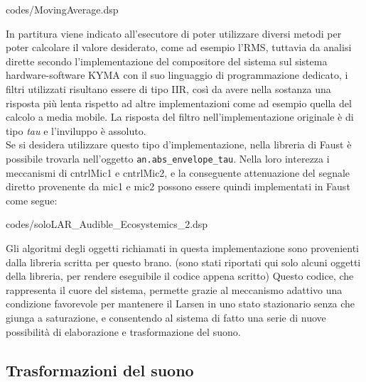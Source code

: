 \vspace{0.5cm} 

{codes/MovingAverage.dsp}

In partitura viene indicato all'esecutore di poter utilizzare diversi metodi 
per poter calcolare il valore desiderato, come ad esempio l'RMS, 
tuttavia da analisi dirette secondo l'implementazione del compositore del sistema sul 
sistema hardware-software KYMA con il suo linguaggio di programmazione dedicato, 
i filtri utilizzati risultano essere di tipo IIR,
così da avere nella sostanza una risposta più lenta rispetto ad altre implementazioni come ad esempio 
quella del calcolo a media mobile.  
La risposta del filtro nell'implementazione originale è di tipo \textit{tau} 
e l'inviluppo è assoluto. \\
Se si desidera utilizzare questo tipo d'implementazione, nella libreria di Faust 
è possibile trovarla nell'oggetto \verb|an.abs_envelope_tau|.
Nella loro interezza i meccanismi di cntrlMic1 e cntrlMic2, e la conseguente
attenuazione del segnale diretto provenente da mic1 e mic2 
possono essere quindi implementati in Faust come segue:

\vspace{0.5cm} 

{codes/soloLAR_Audible_Ecosystemics_2.dsp}

Gli algoritmi degli oggetti richiamati in questa implementazione sono 
provenienti dalla libreria scritta per questo brano.
(sono stati riportati qui solo alcuni oggetti della libreria, per rendere eseguibile
il codice appena scritto)
Questo codice, che rappresenta il cuore del sistema,
permette grazie al meccanismo adattivo una condizione favorevole
per mantenere il Larsen in uno stato stazionario senza che giunga a 
saturazione, e consentendo al sistema
di fatto una serie di nuove possibilità di elaborazione e trasformazione del suono.

\subsection{Trasformazioni del suono}
\label{sec:Trasformazioni del suono}

